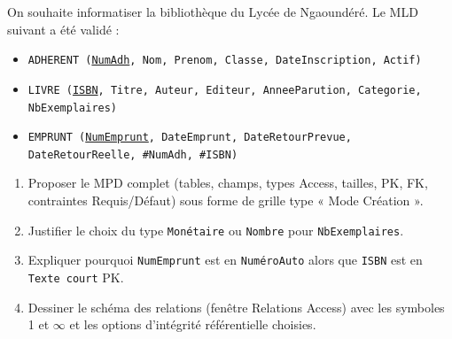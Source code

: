 \documentclass[11pt]{article}
\begin{document}
\begin{exercice}
On souhaite informatiser la bibliothèque du Lycée de Ngaoundéré. Le MLD suivant a été validé :
\begin{itemize}
    \item \texttt{ADHERENT (\underline{NumAdh}, Nom, Prenom, Classe, DateInscription, Actif)}
    \item \texttt{LIVRE (\underline{ISBN}, Titre, Auteur, Editeur, AnneeParution, Categorie, NbExemplaires)}
    \item \texttt{EMPRUNT (\underline{NumEmprunt}, DateEmprunt, DateRetourPrevue, DateRetourReelle, \#NumAdh, \#ISBN)}
\end{itemize}
\begin{enumerate}
    \item Proposer le MPD complet (tables, champs, types Access, tailles, PK, FK, contraintes Requis/Défaut) sous forme de grille type « Mode Création ».
    \item Justifier le choix du type \texttt{Monétaire} ou \texttt{Nombre} pour \texttt{NbExemplaires}.
    \item Expliquer pourquoi \texttt{NumEmprunt} est en \texttt{NuméroAuto} alors que \texttt{ISBN} est en \texttt{Texte court} PK.
    \item Dessiner le schéma des relations (fenêtre Relations Access) avec les symboles 1 et $\infty$ et les options d'intégrité référentielle choisies.
\end{enumerate}
\end{exercice}
\end{document}
